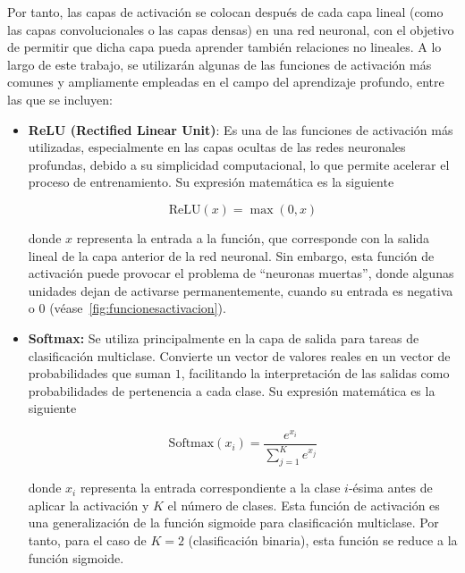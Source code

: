 Por tanto, las capas de activación se colocan después de cada capa lineal (como las capas convolucionales o las capas densas) en una red neuronal, con el objetivo de permitir que dicha capa pueda aprender también relaciones no lineales. A lo largo de este trabajo, se utilizarán algunas de las funciones de activación más comunes y ampliamente empleadas en el campo del aprendizaje profundo, entre las que se incluyen:

\begin{itemize}
    \item \textbf{ReLU (Rectified Linear Unit)}: Es una de las funciones de activación más utilizadas, especialmente en las capas ocultas de las redes neuronales profundas, debido a su simplicidad computacional, lo que permite acelerar el proceso de entrenamiento. Su expresión matemática es la siguiente
    
    \[
        \text{ReLU}(x) = \max(0, x)
    \]

    donde $x$ representa la entrada a la función, que corresponde con la salida lineal de la capa anterior de la red neuronal. Sin embargo, esta función de activación puede provocar el problema de ``neuronas muertas'', donde algunas unidades dejan de activarse permanentemente, cuando su entrada es negativa o $0$ (véase~\autoref{fig:funcionesactivacion}).

    \item \textbf{Softmax:} Se utiliza principalmente en la capa de salida para tareas de clasificación multiclase. Convierte un vector de valores reales en un vector de probabilidades que suman $1$, facilitando la interpretación de las salidas como probabilidades de pertenencia a cada clase. Su expresión matemática es la siguiente
 
    \[
        \text{Softmax}(x_i) = \frac{e^{x_i}}{\sum_{j=1}^{K} e^{x_j}}
    \]

    donde $x_i$ representa la entrada correspondiente a la clase $i$-ésima antes de aplicar la activación y $K$ el número de clases. Esta función de activación es una generalización de la función sigmoide para clasificación multiclase. Por tanto, para el caso de $K=2$ (clasificación binaria), esta función se reduce a la función sigmoide.\newline

\end{itemize}

